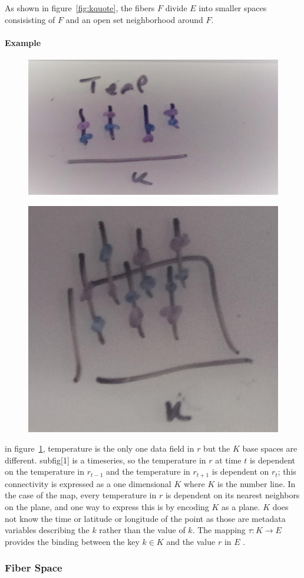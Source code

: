 \documentclass[../main.tex]{subfiles}
\begin{document}
As shown in figure~\ref{fig:kquote}, the fibers $F$ divide $E$ into smaller spaces consisisting of $F$ and an open set neighborhood \cite{FiberBundle2020, rowlandFiberBundle}  around $F$.
\paragraph{Example}

\begin{figure}[ht]
    \includegraphics[width=0.2\linewidth]{figures/sections/math/temp_1k.png}
    \label{fig:k_data}
\end{figure}

\begin{figure}[H]
    \includegraphics[width=0.2\linewidth]{figures/sections/math/temp_2k.png}
\end{figure}

in figure~\ref{fig:k_data}, temperature is the only one data field in $r$ but the $K$ base spaces are different. subfig[1] is a timeseries, so the temperature in $r$ at time $t$ is dependent on the temperature in $r_{t-1}$ and the temperature in $r_{t+1}$ is dependent on  $r_t$; this connectivity is expressed as a one dimensional $K$ where $K$ is the number line. In the case of the map, every temperature in $r$ is dependent on its nearest neighbors on the plane, and one way to express this is by encoding $K$ as a plane. $K$ does not know the time or latitude or longitude of the point as those are metadata variables describing the $k$ rather than the value of $k$. The mapping $\tau: K \rightarrow E$ provides the binding between the key $k \in K$ and the value $r$ in $E$ \cite{munznerChDataAbstraction}.



\subsubsection{Fiber Space}
\label{sec:fiber_data}
\end{document}
